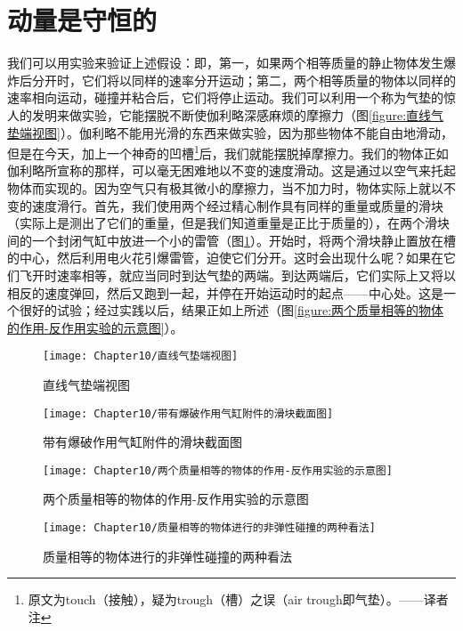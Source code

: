 \section{动量是守恒的}
我们可以用实验来验证上述假设：即，第一，如果两个相等质量的静止物体发生爆炸后分开时，它们将以同样的速率分开运动；第二，两个相等质量的物体以同样的速率相向运动，碰撞并粘合后，它们将停止运动。我们可以利用一个称为气垫的惊人的发明来做实验，它能摆脱不断使伽利略深感麻烦的摩擦力（图\ref{figure:直线气垫端视图}）。伽利略不能用光滑的东西来做实验，因为那些物体不能自由地滑动，但是在今天，加上一个神奇的凹槽\footnote{原文为touch（接触），疑为trough（槽）之误（air trough即气垫）。——译者注}后，我们就能摆脱掉摩擦力。我们的物体正如伽利略所宣称的那样，可以毫无困难地以不变的速度滑动。这是通过以空气来托起物体而实现的。因为空气只有极其微小的摩擦力，当不加力时，物体实际上就以不变的速度滑行。首先，我们使用两个经过精心制作具有同样的重量或质量的滑块（实际上是测出了它们的重量，但是我们知道重量是正比于质量的），在两个滑块间的一个封闭气缸中放进一个小的雷管（图\ref{figure:带有爆破作用气缸附件的滑块截面图}）。开始时，将两个滑块静止置放在槽的中心，然后利用电火花引爆雷管，迫使它们分开。这时会出现什么呢？如果在它们飞开时速率相等，就应当同时到达气垫的两端。到达两端后，它们实际上又将以相反的速度弹回，然后又跑到一起，并停在开始运动时的起点——中心处。这是一个很好的试验；经过实践以后，结果正如上所述（图\ref{figure:两个质量相等的物体的作用-反作用实验的示意图}）。
\begin{figure}[htbp]
    \centering
    \begin{minipage}[t]{0.4\textwidth}
        \centering
        \texttt{[image: Chapter10/直线气垫端视图]}
        \caption{直线气垫端视图}
        \label{figure:直线气垫端视图}
    \end{minipage}
    \begin{minipage}[t]{0.4\textwidth}
        \centering
        \texttt{[image: Chapter10/带有爆破作用气缸附件的滑块截面图]}    
        \caption{带有爆破作用气缸附件的滑块截面图}
        \label{figure:带有爆破作用气缸附件的滑块截面图}
    \end{minipage}
\end{figure}

\begin{figure}[htbp]
    \centering
    \begin{minipage}[t]{0.4\textwidth}
        \centering
        \texttt{[image: Chapter10/两个质量相等的物体的作用-反作用实验的示意图]}
        \caption{两个质量相等的物体的作用-反作用实验的示意图}
        \label{figure:两个质量相等的物体的作用-反作用实验的示意图}
    \end{minipage}
    \begin{minipage}[t]{0.4\textwidth}
        \centering
        \texttt{[image: Chapter10/质量相等的物体进行的非弹性碰撞的两种看法]}    
        \caption{质量相等的物体进行的非弹性碰撞的两种看法}
        \label{figure:质量相等的物体进行的非弹性碰撞的两种看法}
    \end{minipage}
\end{figure}

